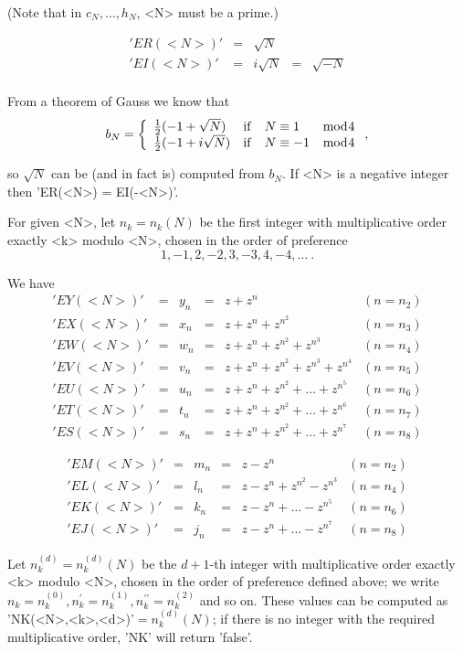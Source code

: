 (Note that in $c_N, \ldots, h_N$, <N> must be a prime.)

\[\begin{array}{lllll}
'ER(<N>)' & = & \sqrt{N}\\
'EI(<N>)' & = & i \sqrt{N} & = & \sqrt{-N}\\
\end{array}\]

From a theorem of Gauss we know that
\[ b_N = \left\{ \begin{array}{llll}
          \frac{1}{2}(-1+\sqrt{N}) & {\rm if} & N\equiv 1 & \bmod 4 \\
          \frac{1}{2}(-1+i\sqrt{N}) & {\rm if} & N\equiv -1 & \bmod 4
          \end{array}\right. ,\]

so $\sqrt{N}$ can be (and in fact is) computed from $b_N$. If <N> is a
negative integer then 'ER(<N>) = EI(-<N>)'.

For  given  <N>,  let  $n_k  =  n_k(N)$  be  the  first  integer  with
multiplicative order  exactly <k>  modulo <N>, chosen  in the order of
preference
\[ 1, -1, 2, -2, 3, -3, 4, -4, \ldots\ .\]

We have
\[\begin{array}{llllll}
'EY(<N>)' & = & y_n & = & z+z^n &(n = n_2)\\
'EX(<N>)' & = & x_n & = & z+z^n+z^{n^2} &(n=n_3)\\
'EW(<N>)' & = & w_n & = & z+z^n+z^{n^2}+z^{n^3} &(n=n_4)\\
'EV(<N>)' & = & v_n & = & z+z^n+z^{n^2}+z^{n^3}+z^{n^4} &(n=n_5)\\
'EU(<N>)' & = & u_n & = & z+z^n+z^{n^2}+\ldots +z^{n^5} &(n=n_6)\\
'ET(<N>)' & = & t_n & = & z+z^n+z^{n^2}+\ldots +z^{n^6} &(n=n_7)\\
'ES(<N>)' & = & s_n & = & z+z^n+z^{n^2}+\ldots +z^{n^7} &(n=n_8)
\end{array}\]

\[\begin{array}{llllll}
'EM(<N>)' & = & m_n & = & z-z^n &(n=n_2)\\
'EL(<N>)' & = & l_n & = & z-z^n+z^{n^2}-z^{n^3} &(n=n_4)\\
'EK(<N>)' & = & k_n & = & z-z^n+\ldots -z^{n^5} &(n=n_6)\\
'EJ(<N>)' & = & j_n & = & z-z^n+\ldots -z^{n^7} &(n=n_8)
\end{array}\]

Let  $n_k^{(d)}  =  n_k^{(d)}(N)$  be   the   $d+1$-th  integer   with
multiplicative order exactly <k> modulo  <N>,  chosen  in the order of
preference          defined          above;          we          write
$n_k=n_k^{(0)},n_k^{\prime}=n_k^{(1)}, n_k^{\prime\prime} = n_k^{(2)}$
and  so  on.  These  values can be  computed  as 'NK(<N>,<k>,<d>)'$  =
n_k^{(d)}(N)$; if there is no integer with the required multiplicative
order, 'NK' will return 'false'.

